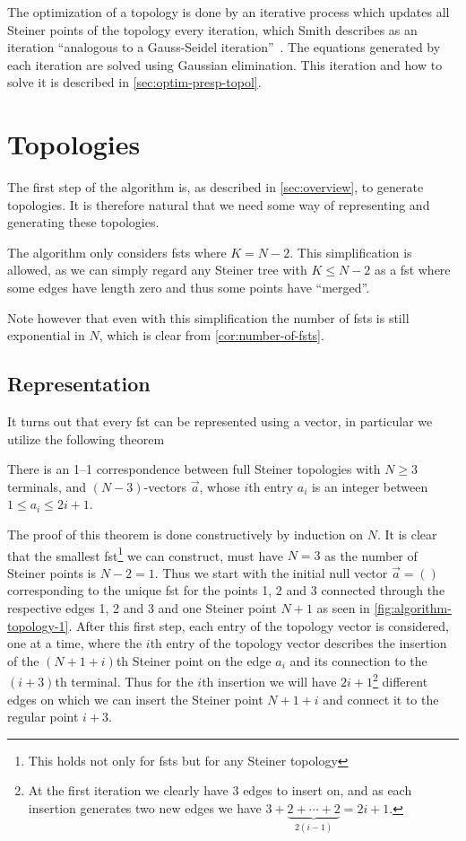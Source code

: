 The optimization of a topology is done by an iterative process which updates all
Steiner points of the topology every iteration, which Smith describes as an
iteration ``analogous to a Gauss-Seidel iteration''~\cite[p.~145]{Smith1992}.
The equations generated by each iteration are solved using Gaussian
elimination. This iteration and how to solve it is described in
\cref{sec:optim-presp-topol}.

\section{Topologies}
\label{sec:topologies}

The first step of the algorithm is, as described in \cref{sec:overview}, to
generate topologies.  It is therefore natural that we need some way of
representing and generating these topologies.

The algorithm only considers \glspl{fst} where $K = N - 2$.  This simplification
is allowed, as we can simply regard any Steiner tree with $K \le N - 2$ as a
\gls{fst} where some edges have length zero and thus some points have
``merged''.

Note however that even with this simplification the number of \glspl{fst} is
still exponential in $N$, which is clear from \cref{cor:number-of-fsts}.

\subsection{Representation}
\label{sec:representation}

It turns out that every \gls{fst} can be represented using a vector, in
particular we utilize the following theorem

\begin{theorem} There is an 1--1 correspondence between full Steiner topologies
with $N \ge 3$ terminals, and $(N-3)$-vectors $\vec{a}$, whose $i$th entry $a_i$
is an integer between $1 \le a_i \le 2 i + 1$.
\end{theorem}

The proof of this theorem is done constructively by induction on $N$.  It is
clear that the smallest \gls{fst}\footnote{This holds not only for \glspl{fst}
  but for any Steiner topology} we
can construct, must have $N = 3$ as the number of Steiner points is $N - 2 = 1$.
Thus we start with the initial null vector $\vec{a} = ()$ corresponding to the
unique \gls{fst} for the points 1, 2 and 3 connected through the respective
edges 1, 2 and 3 and one Steiner point $N+1$ as seen in
\cref{fig:algorithm-topology-1}.  After this first step, each entry of the
topology vector is considered, one at a time, where the $i$th entry of the
topology vector describes the insertion of the $(N+1+i)$th Steiner point on the
edge $a_{i}$ and its connection to the $(i+3)$th terminal.  Thus for the $i$th
insertion we will have $2i+1$\footnote{At the first iteration we clearly have 3
edges to insert on, and as each insertion generates two new edges we have $3 +
\underbrace{2 + \cdots + 2}_{2 (i - 1)} = 2 i + 1$.} different edges on which we
can insert the Steiner point $N+1+i$ and connect it to the regular point $i+3$.

